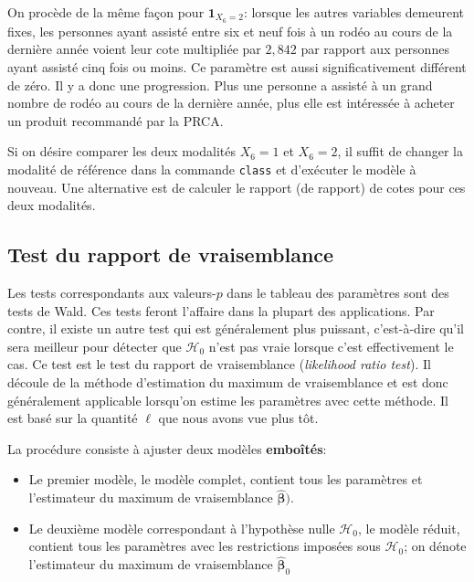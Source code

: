 \documentclass[
  11pt,
  letterpaper,
]{book}
\providecommand{\tightlist}{%
  \setlength{\itemsep}{0pt}\setlength{\parskip}{0pt}}
\theoremstyle{definition}
\theoremstyle{definition}
\theoremstyle{definition}
\theoremstyle{remark}
\begin{document}
On procède de la même façon pour \({\mathbf 1}_{X_6=2}\): lorsque les autres variables demeurent fixes, les personnes ayant assisté entre six et neuf fois à un rodéo au cours de la dernière année voient leur cote multipliée par \(2,842\) par rapport aux personnes ayant assisté cinq fois ou moins. Ce paramètre est aussi significativement différent de zéro. Il y a donc une progression. Plus une personne a assisté à un grand nombre de rodéo au cours de la dernière année, plus elle est intéressée à acheter un produit recommandé par la PRCA.

Si on désire comparer les deux modalités \(X_6=1\) et \(X_6=2\), il suffit de changer la modalité de référence dans la commande \texttt{class} et d'exécuter le modèle à nouveau. Une alternative est de calculer le rapport (de rapport) de cotes pour ces deux modalités.

\hypertarget{test-du-rapport-de-vraisemblance}{%
\subsection{Test du rapport de vraisemblance}\label{test-du-rapport-de-vraisemblance}}

Les tests correspondants aux valeurs-\(p\) dans le tableau des paramètres sont des tests de Wald. Ces tests feront l'affaire dans la plupart des applications. Par contre, il existe un autre test qui est généralement plus puissant, c'est-à-dire qu'il sera meilleur pour détecter que \(\mathcal{H}_0\) n'est pas vraie lorsque c'est effectivement le cas. Ce test est le test du rapport de vraisemblance (\emph{likelihood ratio test}). Il découle de la méthode d'estimation du maximum de vraisemblance et est donc généralement applicable lorsqu'on estime les paramètres avec cette méthode. Il est basé sur la quantité \(\ell\) que nous avons vue plus tôt.

La procédure consiste à ajuster deux modèles \textbf{emboîtés}:

\begin{itemize}
\tightlist
\item
  Le premier modèle, le modèle complet, contient tous les paramètres et l'estimateur du maximum de vraisemblance \(\widehat{\boldsymbol{\beta}})\).
\item
  Le deuxième modèle correspondant à l'hypothèse nulle \(\mathcal{H}_0\), le modèle réduit, contient tous les paramètres avec les restrictions imposées sous \(\mathcal{H}_0\); on dénote l'estimateur du maximum de vraisemblance \(\widehat{\boldsymbol{\beta}}_0\)
\end{itemize}
\end{document}
